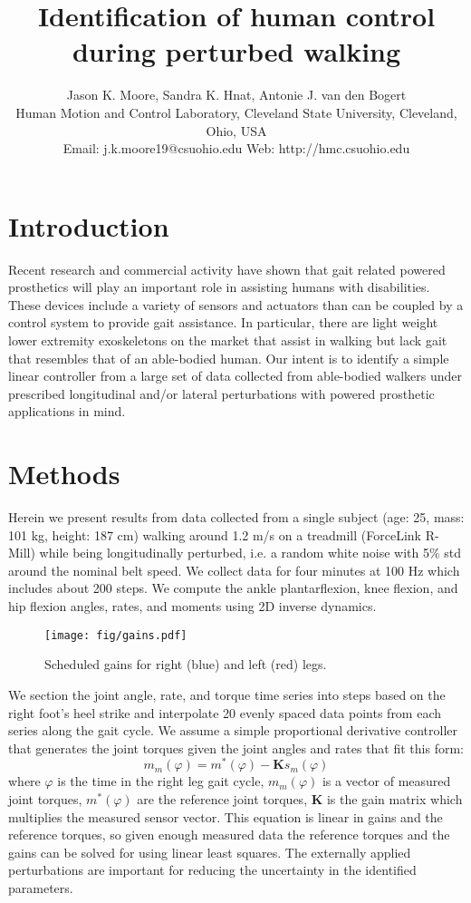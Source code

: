 \documentclass[10pt,letterpaper,notitlepage,twocolumn]{article}
\title{\bf Identification of human control during perturbed walking}
\author{
  Jason K. Moore, Sandra K. Hnat, Antonie J. van den Bogert\\
  Human Motion and Control Laboratory, Cleveland State University, Cleveland, Ohio, USA\\
  Email: j.k.moore19@csuohio.edu Web: http://hmc.csuohio.edu
}
\date{}
\begin{document}

\maketitle

\section*{Introduction}
%
Recent research and commercial activity have shown that gait related powered
prosthetics will play an important role in assisting humans with disabilities.
These devices include a variety of sensors and actuators than can be coupled by
a control system to provide gait assistance. In particular, there are light
weight lower extremity exoskeletons on the market that assist in walking but
lack gait that resembles that of an able-bodied human. Our intent is to
identify a simple linear controller from a large set of data collected from
able-bodied walkers under prescribed longitudinal and/or lateral perturbations
with powered prosthetic applications in mind.
%
\section*{Methods}
Herein we present results from data collected from a single subject (age: 25,
mass: 101 kg, height: 187 cm) walking around 1.2 m/s on a treadmill (ForceLink
R-Mill) while being longitudinally perturbed, i.e. a random white noise with
5\% std around the nominal belt speed. We collect data for four minutes at 100
Hz which includes about 200 steps. We compute the ankle plantarflexion, knee
flexion, and hip flexion angles, rates, and moments using 2D inverse dynamics.
%
\begin{figure}[hbt]
  \begin{center}
    \texttt{[image: fig/gains.pdf]}
    \caption{Scheduled gains for right (blue) and left (red) legs.}
    \label{fig:gains}
  \end{center}
\end{figure}

We section the joint angle, rate, and torque time series into steps based on
the right foot's heel strike and interpolate 20 evenly spaced data points from
each series along the gait cycle. We assume a simple proportional derivative
controller that generates the joint torques given the joint angles and rates
that fit this form:
%
\begin{equation}
  m_m(\varphi) = m^*(\varphi) - \mathbf{K}s_m(\varphi)
\end{equation}
%
where $\varphi$ is the time in the right leg gait cycle, $m_m(\varphi)$ is a vector
of measured joint torques, $m^*(\varphi)$ are the reference joint torques,
$\mathbf{K}$ is the gain matrix which multiplies the measured sensor vector.
This equation is linear in gains and the reference torques, so given enough
measured data the reference torques and the gains can be solved for using
linear least squares. The externally applied perturbations are important for
reducing the uncertainty in the identified parameters.
\end{document}
